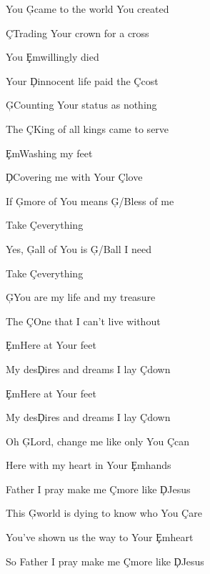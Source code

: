 \documentclass[9pt]{extarticle}
\begin{document}
\bsong

\bi

\ei

\bv
You \c{G}came to the world You created

\c{C}Trading Your crown for a cross

You \c{Em}willingly died

Your \c{D}innocent life paid the \c{C}cost
\ev

\bv
\c{G}Counting Your status as nothing

The \c{C}King of all kings came to serve

\c{Em}Washing my feet

\c{D}Covering me with Your \c{C}love
\ev

\bc
If \c{G}more of You means \c{G/B}less of me

Take \c{C}everything

Yes, \c{G}all of You is \c{G/B}all I need

Take \c{C}everything
\ec

\bv
\c{G}You are my life and my treasure

The \c{C}One that I can't live without

\c{Em}Here at Your feet

My des\c{D}ires and dreams I lay \c{C}down

\c{Em}Here at Your feet

My des\c{D}ires and dreams I lay \c{C}down
\ev


\bb[2]
Oh \c{G}Lord, change me like only You \c{C}can

Here with my heart in Your \c{Em}hands

Father I pray make me \c{C}more like \c{D}Jesus

This \c{G}world is dying to know who You \c{C}are

You've shown us the way to Your \c{Em}heart

So Father I pray make me \c{C}more like \c{D}Jesus
\eb


\esong
\end{document}
